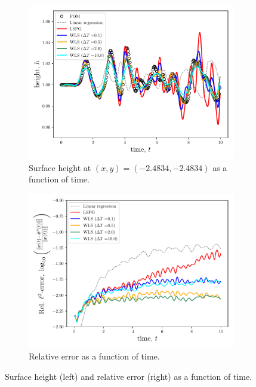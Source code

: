 \begin{figure}
\begin{center}
\begin{subfigure}[t]{0.49\textwidth}
\includegraphics[trim={0cm 0cm 0cm 0cm},clip,width=1.0\linewidth]{figs/swe/swe_h_vs_t_K83.pdf}
\caption{Surface height at $(x,y) = (-2.4834,-2.4834)$ as a function of time.}
\label{fig:rom_sols_swe1h}
\end{subfigure}
\begin{subfigure}[t]{0.49\textwidth}
\includegraphics[trim={0cm 0cm 0cm 0cm},clip,width=1.0\linewidth]{figs/swe/swe_error_vs_t_K83.pdf}
\caption{Relative error as a function of time.}
\label{fig:rom_sols_swe1e}
\end{subfigure}
\caption{Surface height (left) and relative error (right) as a function of time.} 
\label{fig:rom_sols_swe1}
\end{center}
\end{figure}

